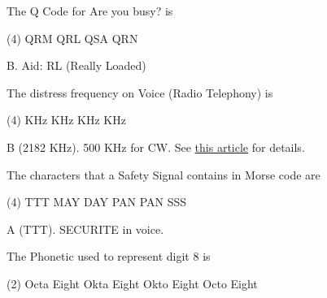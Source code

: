 \documentclass[a4paper]{article}
\begin{document}
\begin{question}The Q Code for \apostrophe{}Are you busy?\apostrophe{} is \spaces
	\begin{tasks}(4)
		\task QRM
		\task QRL
		\task QSA
		\task QRN
	\end{tasks}
\end{question}

\begin{solution}
	B. Aid: RL (Really Loaded)
\end{solution}

\vspace{5mm}



\begin{question}The distress frequency on Voice (Radio Telephony) is \spaces
	\begin{tasks}(4)
		 KHz
		 KHz
		 KHz
		 KHz
	\end{tasks}
\end{question}

\begin{solution}
	B (2182 KHz). 500 KHz for CW. See \href{https://en.wikipedia.org/wiki/2182_kHz}{this article} for details.
\end{solution}

\vspace{5mm}



\begin{question}The characters that a Safety Signal contains in Morse code are \spaces
	\begin{tasks}(4)
		\task TTT
		\task MAY DAY
		\task PAN PAN
		\task SSS
	\end{tasks}
\end{question}

\begin{solution}
	A (TTT). SECURITE in voice.
\end{solution}

\vspace{5mm}



\begin{question}The Phonetic used to represent digit \apostrophe{}8\apostrophe{} is \spaces
	\begin{tasks}(2)
		\task Octa Eight
		\task Okta Eight
		\task Okto Eight
		\task Octo Eight
	\end{tasks}
\end{question}
\end{document}
